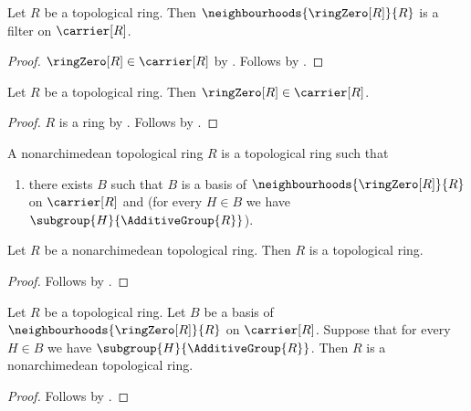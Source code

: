 \begin{classification}\label{topological_ring_zero_neighbourhoods_is_filter}
    Let $R$ be a topological ring.
    Then $\neighbourhoods{\ringZero[R]}{R}$ is a filter on $\carrier[R]$.
\end{classification}
\begin{proof}
    $\ringZero[R]\in\carrier[R]$ by .
    Follows by .
\end{proof}

\begin{classification}\label{topological_ring_zero_type}
    Let $R$ be a topological ring.
    Then $\ringZero[R]\in\carrier[R]$.
\end{classification}
\begin{proof}
    $R$ is a ring by .
    Follows by .
\end{proof}

\begin{struct}\label{nonarchimedean_topological_ring}
    A nonarchimedean topological ring $R$ is a topological ring such that
        \begin{enumerate}
        \item\label{nonarchimedean_topological_ring_subgroup_basis}
        there exists $B$ such that
            $B$ is a basis of
                $\neighbourhoods{\ringZero[R]}{R}$ on $\carrier[R]$ and
            (for every $H\in B$ we have
                $\subgroup{H}{\AdditiveGroup{R}}$).
        \end{enumerate}
\end{struct}

\begin{classification}\label{nonarchimedean_topological_ring_is_topological_ring}
    Let $R$ be a nonarchimedean topological ring.
    Then $R$ is a topological ring.
\end{classification}
\begin{proof}
    Follows by .
\end{proof}

\begin{proposition}\label{topological_ring_with_subgroup_basis_is_nonarchimedean}
    Let $R$ be a topological ring.
    Let $B$ be a basis of
        $\neighbourhoods{\ringZero[R]}{R}$ on $\carrier[R]$.
    Suppose that for every $H\in B$ we have
        $\subgroup{H}{\AdditiveGroup{R}}$.
    Then $R$ is a nonarchimedean topological ring.
\end{proposition}
\begin{proof}
    Follows by .
\end{proof}

